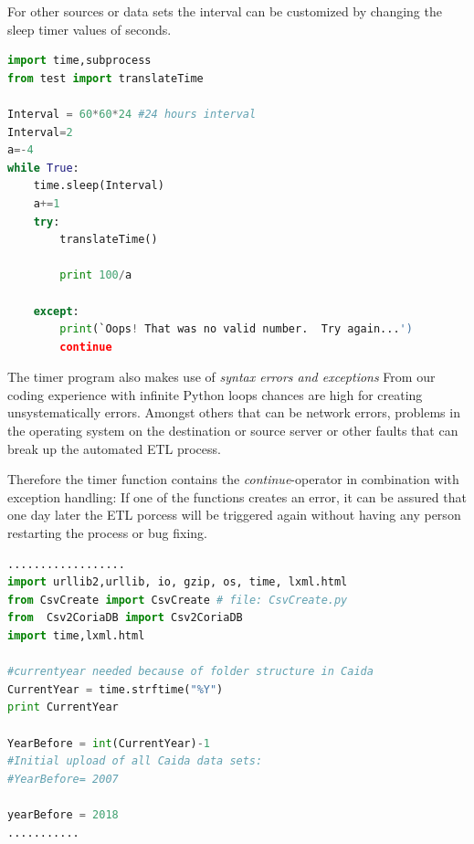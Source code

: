 \documentclass[conference, 11pt]{IEEEtran}
\begin{document}
For other sources or data sets the interval can be customized by changing the sleep timer values of seconds.


\begin{lstlisting}[language=Python, caption={Timer Function},captionpos=b, xleftmargin=.02\textwidth, linewidth = 0.95\columnwidth]
import time,subprocess
from test import translateTime

Interval = 60*60*24 #24 hours interval
Interval=2
a=-4
while True:
	time.sleep(Interval)
	a+=1
	try:
		translateTime()

		print 100/a
		
	except:
		print(`Oops! That was no valid number.  Try again...')
		continue

\end{lstlisting}


The timer program also makes use of \textit{syntax errors and exceptions} %
From our coding experience with infinite Python loops chances are high for creating unsystematically errors. Amongst others that can be network errors, problems in the operating system on the destination or source server or other faults that can break up the automated ETL process.

Therefore the timer function contains the \textit{continue}-operator in combination with exception handling: If one of the functions creates an error, it can be assured that one day later the ETL porcess will be triggered again without having any person restarting the process or bug fixing. \linebreak
\linebreak
\linebreak

\begin{lstlisting}[language=Python, caption={...},captionpos=b, xleftmargin=.02\textwidth, linewidth = 0.95\columnwidth]
..................
import urllib2,urllib, io, gzip, os, time, lxml.html
from CsvCreate import CsvCreate # file: CsvCreate.py
from  Csv2CoriaDB import Csv2CoriaDB
import time,lxml.html

#currentyear needed because of folder structure in Caida
CurrentYear = time.strftime("%Y")
print CurrentYear

YearBefore = int(CurrentYear)-1
#Initial upload of all Caida data sets:
#YearBefore= 2007

yearBefore = 2018
...........
\end{lstlisting}
\end{document}
